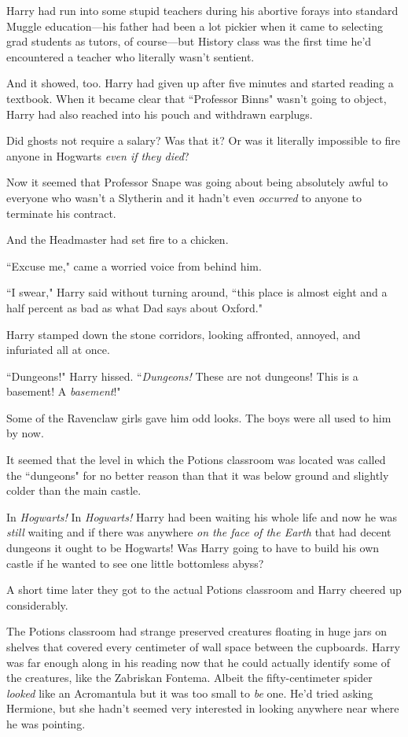 Harry had run into some stupid teachers during his abortive forays into standard Muggle education—his father had been a lot pickier when it came to selecting grad students as tutors, of course—but History class was the first time he'd encountered a teacher who literally wasn't sentient.

And it showed, too. Harry had given up after five minutes and started reading a textbook. When it became clear that ``Professor Binns" wasn't going to object, Harry had also reached into his pouch and withdrawn earplugs.

Did ghosts not require a salary? Was that it? Or was it literally impossible to fire anyone in Hogwarts \emph{even if they died}?

Now it seemed that Professor Snape was going about being absolutely awful to everyone who wasn't a Slytherin and it hadn't even \emph{occurred} to anyone to terminate his contract.

And the Headmaster had set fire to a chicken.

``Excuse me," came a worried voice from behind him.

``I swear," Harry said without turning around, ``this place is almost eight and a half percent as bad as what Dad says about Oxford."

\later

Harry stamped down the stone corridors, looking affronted, annoyed, and infuriated all at once.

``Dungeons!" Harry hissed. ``\emph{Dungeons!} These are not dungeons! This is a basement! A \emph{basement}!"

Some of the Ravenclaw girls gave him odd looks. The boys were all used to him by now.

It seemed that the level in which the Potions classroom was located was called the ``dungeons" for no better reason than that it was below ground and slightly colder than the main castle.

In \emph{Hogwarts!} In \emph{Hogwarts!} Harry had been waiting his whole life and now he was \emph{still} waiting and if there was anywhere \emph{on the face of the Earth} that had decent dungeons it ought to be Hogwarts! Was Harry going to have to build his own castle if he wanted to see one little bottomless abyss?

A short time later they got to the actual Potions classroom and Harry cheered up considerably.

The Potions classroom had strange preserved creatures floating in huge jars on shelves that covered every centimeter of wall space between the cupboards. Harry was far enough along in his reading now that he could actually identify some of the creatures, like the Zabriskan Fontema. Albeit the fifty-centimeter spider \emph{looked} like an Acromantula but it was too small to \emph{be} one. He'd tried asking Hermione, but she hadn't seemed very interested in looking anywhere near where he was pointing.

